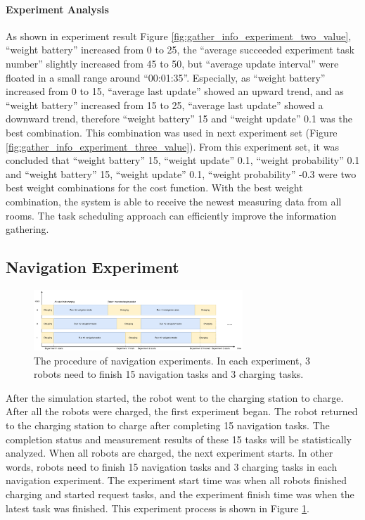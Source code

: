 \paragraph{Experiment Analysis} 
As shown in experiment result Figure \ref{fig:gather_info_experiment_two_value}, ``weight battery'' increased from 0 to 25, the ``average succeeded experiment task number'' slightly increased from 45 to 50, but ``average update interval'' were floated in a small range around ``00:01:35''. Especially, as ``weight battery'' increased from 0 to 15, ``average last update'' showed an upward trend, and as ``weight battery'' increased from 15 to 25, ``average last update'' showed a downward trend, 
therefore ``weight battery'' 15 and ``weight update'' 0.1 was the best combination. 
This combination was used in next experiment set (Figure \ref{fig:gather_info_experiment_three_value}). From this experiment set, it was concluded that ``weight battery'' 15, ``weight update'' 0.1, ``weight probability'' 0.1 and ``weight battery'' 15, ``weight update'' 0.1, ``weight probability'' -0.3 were two best weight combinations for the cost function. With the best weight combination, the system is able to receive the newest measuring data from all rooms. The task scheduling approach can efficiently improve the information gathering.



\subsection{Navigation Experiment}

\begin{figure}
\centering
\includegraphics[width = 0.7\textwidth]{content/images/ch5/exe_exp_timeline.drawio.png}
\caption{The procedure of navigation experiments. In each experiment, 3 robots need to finish 15 navigation tasks and 3 charging tasks.}
\label{fig:nav_exp_timeline}
\end{figure}

After the simulation started, the robot went to the charging station to charge. After all the robots were charged, the first experiment began. The robot returned to the charging station to charge after completing 15 navigation tasks. The completion status and measurement results of these 15 tasks will be statistically analyzed. When all robots are charged, the next experiment starts. In other words, robots need to finish 15 navigation tasks and 3 charging tasks in each navigation experiment. The experiment start time was when all robots finished charging and started request tasks, and the experiment finish time was when the latest task was finished. This experiment process is shown in Figure  \ref{fig:nav_exp_timeline}.

